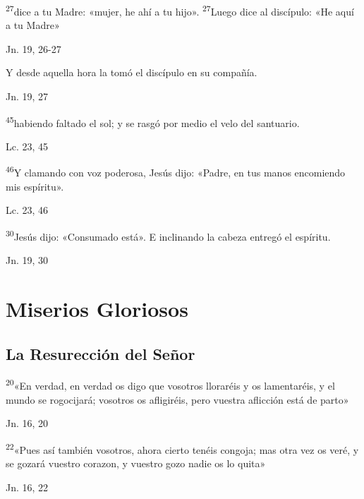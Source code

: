 \documentclass[a4paper,11pt]{article}
\begin{document}
      \textsuperscript{27}dice a tu Madre: «mujer, he ahí a tu hijo». \textsuperscript{27}Luego dice al discípulo: «He aquí a tu Madre»
      \begin{flushright}
        Jn. 19, 26-27
      \end{flushright}

      Y desde aquella hora la tomó el discípulo en su compañía.
      \begin{flushright}
        Jn. 19, 27
      \end{flushright}

      \textsuperscript{45}habiendo faltado el sol; y se rasgó por medio el velo del santuario.
      \begin{flushright}
        Lc. 23, 45
      \end{flushright}

      \textsuperscript{46}Y clamando con voz poderosa, Jesús dijo: «Padre, en tus manos encomiendo mis espíritu».
      \begin{flushright}
        Lc. 23, 46 
      \end{flushright}

      \textsuperscript{30}Jesús dijo: «Consumado está». E inclinando la cabeza entregó el espíritu.
      \begin{flushright}
        Jn. 19, 30
      \end{flushright}
 
    \newpage
         
  \section*{\hfil Miserios Gloriosos \hfil}
    \subsection*{\hfil La Resurección del Señor \hfil}
      
      \textsuperscript{20}«En verdad, en verdad os digo que vosotros lloraréis y os lamentaréis, y el mundo se rogocijará;
      vosotros os afligiréis, pero vuestra aflicción está de parto»
      \begin{flushright}
        Jn. 16, 20        
      \end{flushright}

      \textsuperscript{22}«Pues así también vosotros, ahora cierto tenéis congoja; mas otra vez os veré, y se gozará vuestro corazon,
      y vuestro gozo nadie os lo quita»
      \begin{flushright}
        Jn. 16, 22       
      \end{flushright}
\end{document}
